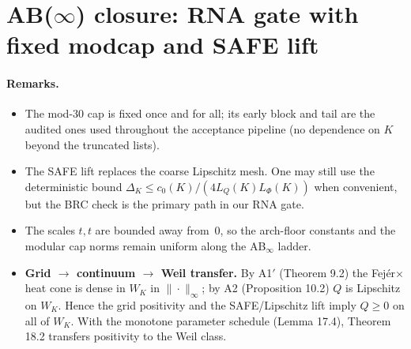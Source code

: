 \section*{AB($\infty$) closure: RNA gate with fixed modcap and SAFE lift}



\paragraph{Remarks.}
\begin{itemize}
  \item The mod-30 cap is fixed once and for all; its early block and tail are the audited
        ones used throughout the acceptance pipeline (no dependence on $K$ beyond the
        truncated lists).
  \item The SAFE lift replaces the coarse Lipschitz mesh. One may still use the deterministic
        bound $\Delta_K \le c_0(K)/(4 L_Q(K) L_\Phi(K))$ when convenient, but the BRC
        check is the primary path in our RNA gate.
  \item The scales $t, t$ are bounded away from~$0$, so the
        arch-floor constants and the modular cap norms remain uniform along the
        AB$_\infty$ ladder.
  \item \textbf{Grid $\to$ continuum $\to$ Weil transfer.} By A1$'$ (Theorem 9.2) the Fej\'er$\times$heat cone is dense in $W_K$ in $\|\cdot\|_\infty$; by A2 (Proposition 10.2) $Q$ is Lipschitz on $W_K$. Hence the grid positivity and the SAFE/Lipschitz lift imply $Q\ge0$ on all of $W_K$. With the monotone parameter schedule (Lemma 17.4), Theorem 18.2 transfers positivity to the Weil class.
\end{itemize}
